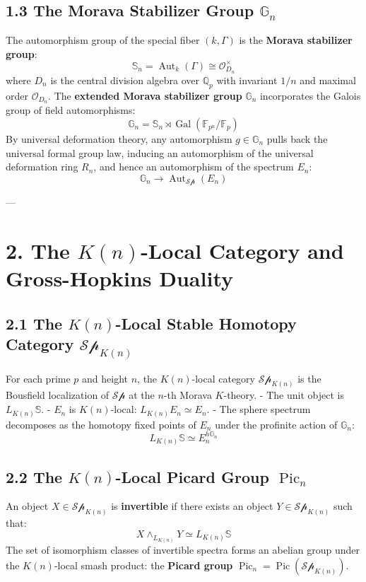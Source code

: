 \documentclass[11pt,twoside,openright]{amsbook}
\begin{document}
{\subsection{1.3 The Morava Stabilizer Group $\mathbb{G}_n$}
The automorphism group of the special fiber $(k, \Gamma)$ is the \textbf{Morava stabilizer group}:
$$\mathbb{S}_n = \operatorname{Aut}_k(\Gamma) \cong \mathcal{O}_{D_n}^\times$$
where $D_n$ is the central division algebra over $\mathbb{Q}_p$ with invariant $1/n$ and maximal order $\mathcal{O}_{D_n}$.
The \textbf{extended Morava stabilizer group} $\mathbb{G}_n$ incorporates the Galois group of field automorphisms:
$$\mathbb{G}_n = \mathbb{S}_n \rtimes \operatorname{Gal}(\mathbb{F}_{p^n} / \mathbb{F}_p)$$
By universal deformation theory, any automorphism $g \in \mathbb{G}_n$ pulls back the universal formal group law, inducing an automorphism of the universal deformation ring $R_n$, and hence an automorphism of the spectrum $E_n$:
$$\mathbb{G}_n \longrightarrow \operatorname{Aut}_{\mathcal{Sp}}(E_n)$$

---

\section{2. The $K(n)$-Local Category and Gross-Hopkins Duality}

\subsection{2.1 The $K(n)$-Local Stable Homotopy Category $\mathcal{Sp}_{K(n)}$}
For each prime $p$ and height $n$, the $K(n)$-local category $\mathcal{Sp}_{K(n)}$ is the Bousfield localization of $\mathcal{Sp}$ at the $n$-th Morava $K$-theory.
- The unit object is $L_{K(n)} \mathbb{S}$.
- $E_n$ is $K(n)$-local: $L_{K(n)} E_n \simeq E_n$.
- The sphere spectrum decomposes as the homotopy fixed points of $E_n$ under the profinite action of $\mathbb{G}_n$:
  $$L_{K(n)} \mathbb{S} \simeq E_n^{h \mathbb{G}_n}$$

\subsection{2.2 The $K(n)$-Local Picard Group $\operatorname{Pic}_n$}
An object $X \in \mathcal{Sp}_{K(n)}$ is \textbf{invertible} if there exists an object $Y \in \mathcal{Sp}_{K(n)}$ such that:
$$X \wedge_{L_{K(n)}} Y \simeq L_{K(n)} \mathbb{S}$$
The set of isomorphism classes of invertible spectra forms an abelian group under the $K(n)$-local smash product: the \textbf{Picard group} $\operatorname{Pic}_n = \operatorname{Pic}(\mathcal{Sp}_{K(n)})$.

}
\end{document}
